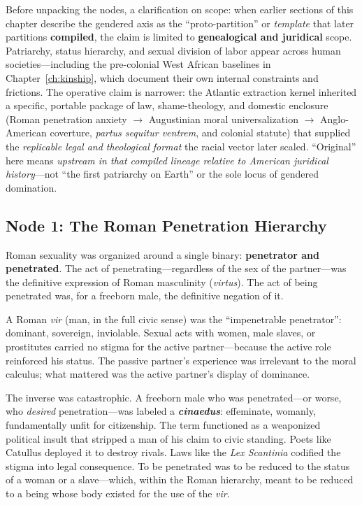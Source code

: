 Before unpacking the nodes, a clarification on scope: when earlier sections of this chapter describe the gendered axis as the ``proto-partition'' or \textit{template} that later partitions \textbf{compiled}, the claim is limited to \textbf{genealogical and juridical} scope. Patriarchy, status hierarchy, and sexual division of labor appear across human societies---including the pre-colonial West African baselines in Chapter~\ref{ch:kinship}, which document their own internal constraints and frictions. The operative claim is narrower: the Atlantic extraction kernel inherited a specific, portable package of law, shame-theology, and domestic enclosure (Roman penetration anxiety $\rightarrow$ Augustinian moral universalization $\rightarrow$ Anglo-American coverture, \textit{partus sequitur ventrem}, and colonial statute) that supplied the \textit{replicable legal and theological format} the racial vector later scaled. ``Original'' here means \textit{upstream in that compiled lineage relative to American juridical history}---not ``the first patriarchy on Earth'' or the sole locus of gendered domination.

\subsection{Node 1: The Roman Penetration Hierarchy}

Roman sexuality was organized around a single binary: \textbf{penetrator and penetrated}. The act of penetrating---regardless of the sex of the partner---was the definitive expression of Roman masculinity (\textit{virtus}). The act of being penetrated was, for a freeborn male, the definitive negation of it.

A Roman \textit{vir} (man, in the full civic sense) was the ``impenetrable penetrator'': dominant, sovereign, inviolable. Sexual acts with women, male slaves, or prostitutes carried no stigma for the active partner---because the active role reinforced his status. The passive partner's experience was irrelevant to the moral calculus; what mattered was the active partner's display of dominance.

The inverse was catastrophic. A freeborn male who was penetrated---or worse, who \textit{desired} penetration---was labeled a \textbf{\textit{cinaedus}}: effeminate, womanly, fundamentally unfit for citizenship. The term functioned as a weaponized political insult that stripped a man of his claim to civic standing. Poets like Catullus deployed it to destroy rivals. Laws like the \textit{Lex Scantinia} codified the stigma into legal consequence. To be penetrated was to be reduced to the status of a woman or a slave---which, within the Roman hierarchy, meant to be reduced to a being whose body existed for the use of the \textit{vir}.

